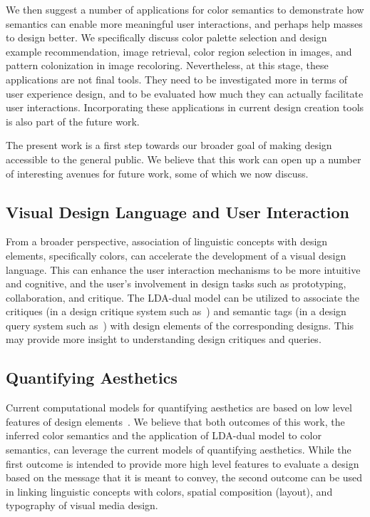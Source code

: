 \documentclass[prodmode,acmtochi]{acmsmall}
\begin{document}
We then suggest a number of applications for color semantics to demonstrate how semantics can enable more meaningful user interactions, and perhaps help masses to design better.
We specifically discuss color palette selection and design example recommendation, image retrieval, color region selection in images, and pattern colonization in image recoloring.
Nevertheless, at this stage, these applications are not final tools. They need to be investigated more in terms of user experience design, and to be evaluated how much they can actually facilitate user interactions. Incorporating these applications in current design creation tools is also part of the future work.

The present work is a first step towards our broader
goal of making design accessible to the general public.  We believe that this
work can open up a number of interesting avenues for future work, some
of which we now discuss.

\subsection{Visual Design Language and User Interaction}

From a broader perspective, association of linguistic concepts with
design elements, specifically colors, can accelerate the development of
a visual design language.  This can enhance the user interaction
mechanisms to be more intuitive and cognitive, and the user's
involvement in design tasks such as prototyping, collaboration, and
critique.  The LDA-dual model can be utilized to associate the critiques
(in a design critique system such as~\cite{xu2014voyant}) and semantic
tags (in a design query system such as~\cite{kumar2013webzeitgeist})
with design elements of the corresponding designs.  This may provide
more insight to understanding design critiques and queries.


\subsection{Quantifying Aesthetics}

Current computational models for quantifying aesthetics are based on low
level features of design
elements~\cite{datta2006studying,li2009aesthetic,joshi2011aesthetics,reinecke2013predicting}.
We believe that both outcomes of this work, the inferred color semantics and
the application of LDA-dual model to color semantics, can leverage the current models of quantifying
aesthetics. While the first outcome is intended to provide more high
level features to evaluate a design based on the message that it is
meant to convey, the second outcome can be used in linking linguistic
concepts with colors, spatial composition (layout), and typography of visual
media design.
\end{document}
